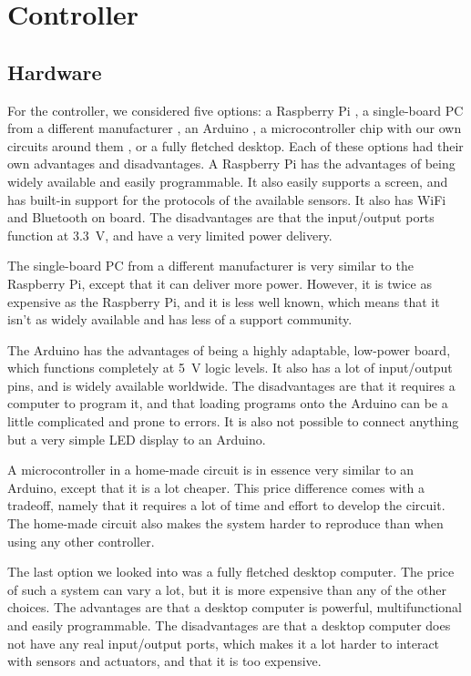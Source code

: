 \documentclass[a4paper,oneside]{book}
\begin{document}
\section{Controller}
\subsection{Hardware}
For the controller, we considered five options: a Raspberry Pi
\cite{RaspberryPi}, a single-board PC from a different manufacturer
\cite{BananaPi}, an Arduino \cite{Arduino}, a microcontroller chip with our own
circuits around them \cite{AtMega}, or a fully fletched desktop. Each of these
options had their own advantages and disadvantages. A Raspberry Pi has the
advantages of being widely available and easily programmable. It also easily
supports a screen, and has built-in support for the protocols of the available
sensors. It also has WiFi and Bluetooth on board. The disadvantages are that
the input/output ports function at \SI{3.3}{\volt}, and have a very limited
power delivery.

The single-board PC from a different manufacturer is very similar to the
Raspberry Pi, except that it can deliver more power. However, it is twice as
expensive as the Raspberry Pi, and it is less well known, which means that it
isn't as widely available and has less of a support community.

The Arduino has the advantages of being a highly adaptable, low-power board,
which functions completely at \SI{5}{\volt} logic levels. It also has a lot of
input/output pins, and is widely available worldwide. The disadvantages are
that it requires a computer to program it, and that loading programs onto the
Arduino can be a little complicated and prone to errors. It is also not
possible to connect anything but a very simple LED display to an Arduino.

A microcontroller in a home-made circuit is in essence very similar to an
Arduino, except that it is a lot cheaper. This price difference comes with a
tradeoff, namely that it requires a lot of time and effort to develop the
circuit. The home-made circuit also makes the system harder to reproduce than
when using any other controller.

The last option we looked into was a fully fletched desktop computer. The price
of such a system can vary a lot, but it is more expensive than any of the other
choices. The advantages are that a desktop computer is powerful,
multifunctional and easily programmable. The disadvantages are that a desktop
computer does not have any real input/output ports, which makes it a lot harder
to interact with sensors and actuators, and that it is too expensive.
\end{document}
